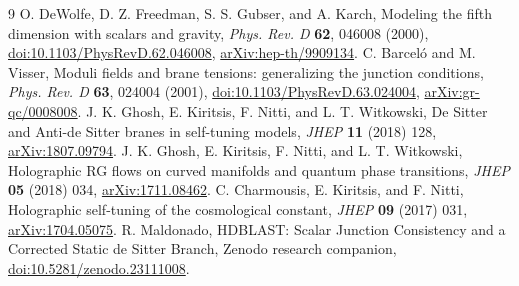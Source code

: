 \documentclass[11pt]{article}
\begin{document}
\begin{thebibliography}{9}
 O. DeWolfe, D. Z. Freedman, S. S. Gubser, and A. Karch,
Modeling the fifth dimension with scalars and gravity,
\emph{Phys. Rev. D} \textbf{62}, 046008 (2000),
\href{https://doi.org/10.1103/PhysRevD.62.046008}{doi:10.1103/PhysRevD.62.046008},
\href{https://arxiv.org/abs/hep-th/9909134}{arXiv:hep-th/9909134}.
 C. Barcel\'o and M. Visser,
Moduli fields and brane tensions: generalizing the junction conditions,
\emph{Phys. Rev. D} \textbf{63}, 024004 (2001),
\href{https://doi.org/10.1103/PhysRevD.63.024004}{doi:10.1103/PhysRevD.63.024004},
\href{https://arxiv.org/abs/gr-qc/0008008}{arXiv:gr-qc/0008008}.
 J. K. Ghosh, E. Kiritsis, F. Nitti, and L. T. Witkowski,
De Sitter and Anti-de Sitter branes in self-tuning models,
\emph{JHEP} \textbf{11} (2018) 128,
\href{https://arxiv.org/abs/1807.09794}{arXiv:1807.09794}.
 J. K. Ghosh, E. Kiritsis, F. Nitti, and L. T. Witkowski,
Holographic RG flows on curved manifolds and quantum phase transitions,
\emph{JHEP} \textbf{05} (2018) 034,
\href{https://arxiv.org/abs/1711.08462}{arXiv:1711.08462}.
 C. Charmousis, E. Kiritsis, and F. Nitti,
Holographic self-tuning of the cosmological constant,
\emph{JHEP} \textbf{09} (2017) 031,
\href{https://arxiv.org/abs/1704.05075}{arXiv:1704.05075}.
 R. Maldonado,
HDBLAST: Scalar Junction Consistency and a Corrected Static de Sitter Branch,
Zenodo research companion,
\href{https://doi.org/10.5281/zenodo.23111008}{doi:10.5281/zenodo.23111008}.
\end{thebibliography}
\end{document}
